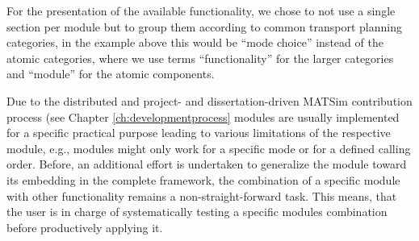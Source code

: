 For the presentation of the available functionality, we chose to not use a single section per module but to group them according to common transport planning categories, in the example above this would be ``mode choice'' instead of the atomic categories, where we use terms ``functionality'' for the larger categories and ``module'' for the atomic components.

Due to the distributed and project- and dissertation-driven MATSim contribution process (see Chapter \ref{ch:developmentprocess} modules are usually implemented for a specific practical purpose leading to various limitations of the respective module, e.g., modules might only work for a specific mode or for a defined calling order. Before, an additional effort is undertaken to generalize the module toward its embedding in the complete framework, the combination of a specific module with other functionality remains a non-straight-forward task. This means, that the user is in charge of systematically testing a specific modules combination before productively applying it.

